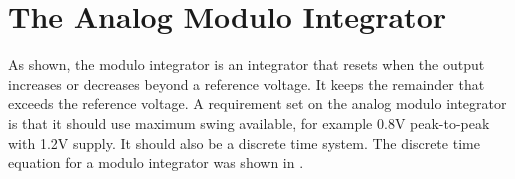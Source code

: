 

\section{The Analog Modulo Integrator} \label{p3modint}
As shown, the modulo integrator is an integrator that resets when the output
increases or decreases beyond a reference voltage. It keeps the remainder that exceeds the reference voltage. A requirement set on the analog modulo integrator is that it should use maximum
swing available, for example 0.8V peak-to-peak with 1.2V supply. It should also be
a discrete time system. The discrete time equation for a
modulo integrator was shown in .

